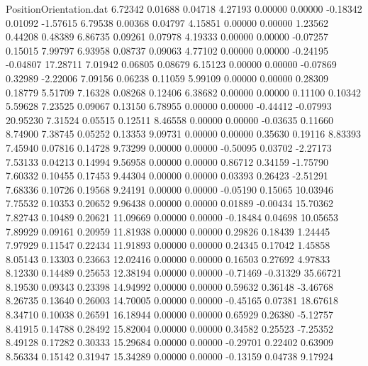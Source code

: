 \begin{filecontents}{PositionOrientation.dat}
   6.72342    0.01688    0.04718     4.27193    0.00000    0.00000   -0.18342    0.01092   -1.57615
   6.79538    0.00368    0.04797     4.15851    0.00000    0.00000    1.23562    0.44208    0.48389
   6.86735    0.09261    0.07978     4.19333    0.00000    0.00000   -0.07257    0.15015    7.99797
   6.93958    0.08737    0.09063     4.77102    0.00000    0.00000   -0.24195   -0.04807   17.28711
   7.01942    0.06805    0.08679     6.15123    0.00000    0.00000   -0.07869    0.32989   -2.22006
   7.09156    0.06238    0.11059     5.99109    0.00000    0.00000    0.28309    0.18779    5.51709
   7.16328    0.08268    0.12406     6.38682    0.00000    0.00000    0.11100    0.10342    5.59628
   7.23525    0.09067    0.13150     6.78955    0.00000    0.00000   -0.44412   -0.07993   20.95230
   7.31524    0.05515    0.12511     8.46558    0.00000    0.00000   -0.03635    0.11660    8.74900
   7.38745    0.05252    0.13353     9.09731    0.00000    0.00000    0.35630    0.19116    8.83393
   7.45940    0.07816    0.14728     9.73299    0.00000    0.00000   -0.50095    0.03702   -2.27173
   7.53133    0.04213    0.14994     9.56958    0.00000    0.00000    0.86712    0.34159   -1.75790
   7.60332    0.10455    0.17453     9.44304    0.00000    0.00000    0.03393    0.26423   -2.51291
   7.68336    0.10726    0.19568     9.24191    0.00000    0.00000   -0.05190    0.15065   10.03946
   7.75532    0.10353    0.20652     9.96438    0.00000    0.00000    0.01889   -0.00434   15.70362
   7.82743    0.10489    0.20621    11.09669    0.00000    0.00000   -0.18484    0.04698   10.05653
   7.89929    0.09161    0.20959    11.81938    0.00000    0.00000    0.29826    0.18439    1.24445
   7.97929    0.11547    0.22434    11.91893    0.00000    0.00000    0.24345    0.17042    1.45858
   8.05143    0.13303    0.23663    12.02416    0.00000    0.00000    0.16503    0.27692    4.97833
   8.12330    0.14489    0.25653    12.38194    0.00000    0.00000   -0.71469   -0.31329   35.66721
   8.19530    0.09343    0.23398    14.94992    0.00000    0.00000    0.59632    0.36148   -3.46768
   8.26735    0.13640    0.26003    14.70005    0.00000    0.00000   -0.45165    0.07381   18.67618
   8.34710    0.10038    0.26591    16.18944    0.00000    0.00000    0.65929    0.26380   -5.12757
   8.41915    0.14788    0.28492    15.82004    0.00000    0.00000    0.34582    0.25523   -7.25352
   8.49128    0.17282    0.30333    15.29684    0.00000    0.00000   -0.29701    0.22402    0.63909
   8.56334    0.15142    0.31947    15.34289    0.00000    0.00000   -0.13159    0.04738    9.17924

\end{filecontents}

